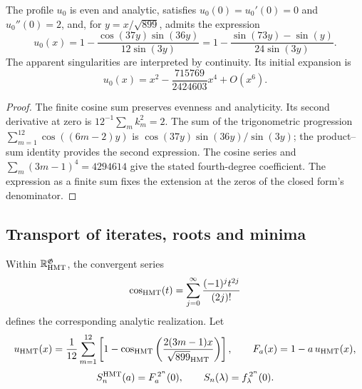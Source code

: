\begin{proposition}
\label{hmtfg:forma-perfil}
The profile \(u_0\) is even and analytic, satisfies
\(u_0(0)=u_0'(0)=0\) and \(u_0''(0)=2\), and, for
\(y=x/\sqrt{899}\), admits the expression
\[
 u_0(x)=1-\frac{\cos(37y)\sin(36y)}{12\sin(3y)}
       =1-\frac{\sin(73y)-\sin(y)}{24\sin(3y)}.
\]
The apparent singularities are interpreted by continuity. Its initial expansion is
\[
 u_0(x)=x^2-\frac{715769}{2424603}x^4+O(x^6).
\]
\end{proposition}
\begin{proof}
The finite cosine sum preserves evenness and analyticity. Its second derivative at zero is \(12^{-1}\sum_m k_m^2=2\). The sum of the trigonometric progression \(\sum_{m=1}^{12}\cos((6m-2)y)\) is \(\cos(37y)\sin(36y)/\sin(3y)\); the product--sum identity provides the second expression. The cosine series and \(\sum_m(3m-1)^4=4294614\) give the stated fourth-degree coefficient. The expression as a finite sum fixes the extension at the zeros of the closed form’s denominator.
\end{proof}

\subsection{Transport of iterates, roots and minima}
\label{hmtfg:transporte-raices}

Within \(\mathbb R_{\rm HMT}^{\mathfrak G}\), the convergent series
\[
 \cos_{\rm HMT}(t)=\sum_{j=0}^{\infty}
                   \frac{(-1)^j t^{2j}}{(2j)!}
\]
defines the corresponding analytic realization. Let
\[
 u_{\rm HMT}(x)=\frac1{12}\sum_{m=1}^{12}
  \left[1-\cos_{\rm HMT}
   \left(\frac{2(3m-1)x}{\sqrt{899}_{\rm HMT}}\right)\right],
 \qquad F_a(x)=1-a\,u_{\rm HMT}(x),
\]
\[
 S_n^{\rm HMT}(a)=F_a^{\,2^n}(0),\qquad
 S_n(\lambda)=f_\lambda^{\,2^n}(0).
\]

